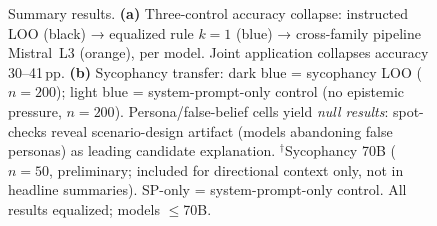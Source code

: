\begin{figure}[t]
\caption{Summary results. \textbf{(a)} Three-control accuracy collapse: instructed LOO (black) → equalized rule $k=1$ (blue) → cross-family pipeline Mistral~L3 (orange), per model. Joint application collapses accuracy 30--41\,pp. \textbf{(b)} Sycophancy transfer: dark blue = sycophancy LOO ($n\!=\!200$); light blue = system-prompt-only control (no epistemic pressure, $n\!=\!200$). Persona/false-belief cells yield \emph{null results}: spot-checks reveal scenario-design artifact (models abandoning false personas) as leading candidate explanation. $^\dag$Sycophancy 70B ($n\!=\!50$, preliminary; included for directional context only, not in headline summaries). SP-only = system-prompt-only control. All results equalized; models $\leq$70B.}
\label{fig:summary_results}
\vspace{-1em}
\end{figure}
